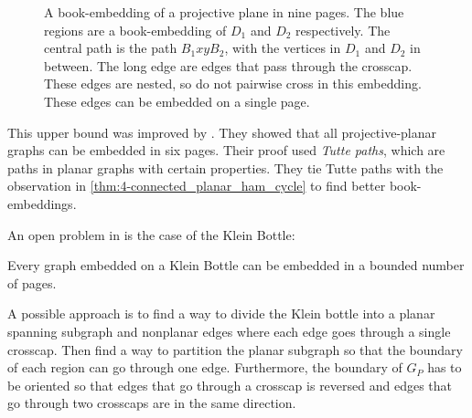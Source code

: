 \begin{figure}[h]
    \centering
    
    \caption[Projective-Planar book-embedding]{A book-embedding of a projective plane in nine pages. The blue regions are a book-embedding of $D_1$ and $D_2$ respectively. The central path is the path $B_1 xy B_2$, with the vertices in $D_1$ and $D_2$ in between. The long edge are edges that pass through the crosscap. These edges are nested, so do not pairwise cross in this embedding. These edges can be embedded on a single page. }\label{fig:projectiveplanarbookembedding}
\end{figure}
 This upper bound was improved by \textcite{ozekiBookEmbeddingGraphs2019}. They showed that all projective-planar graphs can be embedded in six pages. Their proof used \textit{Tutte paths}, which are paths in planar graphs with certain properties. They tie Tutte paths with the observation in \cref{thm:4-connected_planar_ham_cycle} to find better book-embeddings. 

An open problem in \textcite{ozekiBookEmbeddingGraphs2019} is the case of the Klein Bottle:
\begin{conjecture}\label{conj:klein_bottle}
    Every graph embedded on a Klein Bottle can be embedded in a bounded number of pages.
\end{conjecture}

A possible approach is to find a way to divide the Klein bottle into a planar spanning subgraph and nonplanar edges where each edge goes through a single crosscap. Then find a way to partition the planar subgraph so that the boundary of each region can go through one edge. Furthermore, the boundary of $G_P$ has to be oriented so that edges that go through a crosscap is reversed and edges that go through two crosscaps are in the same direction. 